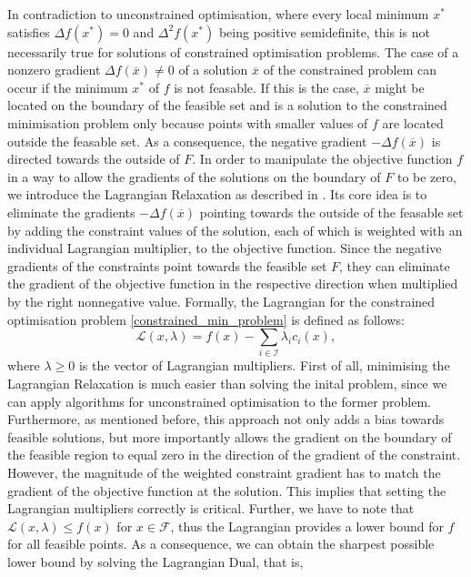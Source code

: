 \indent In contradiction to unconstrained optimisation, where every local minimum $x^*$ satisfies $\Delta f(x^*) = 0$ and $\Delta^2 f(x^*)$ being positive semidefinite, this is not necessarily true for solutions of constrained optimisation problems. The case of a nonzero gradient $\Delta f(\overline{x}) \neq 0$ of a solution $\overline{x}$ of the constrained problem can occur if the minimum $x^*$ of $f$ is not feasable. If this is the case, $\overline{x}$ might be located on the boundary of the feasible set and is a solution to the constrained minimisation problem only because points with smaller values of $f$ are located outside the feasable set. As a consequence, the negative gradient $-\Delta f(\overline{x})$ is directed towards the outside of $F$. In order to manipulate the objective function $f$ in a way to allow the gradients of the solutions on the boundary of $F$ to be zero, we introduce the Lagrangian Relaxation as described in \cite{NoceWrig06}. Its core idea is to eliminate the gradients $-\Delta f(\overline{x})$ pointing towards the outside of the feasable set by adding the constraint values of the solution, each of which is weighted with an individual Lagrangian multiplier, to the objective function. Since the negative gradients of the constraints point towards the feasible set $F$, they can eliminate the gradient of the objective function in the respective direction when multiplied by the right nonnegative value. Formally, the Lagrangian for the constrained optimisation problem \eqref{constrained_min_problem} is defined as follows:
\[ \mathcal{L}(x, \lambda) = f(x) - \sum_{i \in \mathcal{I}} \lambda_i c_i(x), \]
where $\lambda \geq 0$ is the vector of Lagrangian multipliers. First of all, minimising the Lagrangian Relaxation is much easier than solving the inital problem, since we can apply algorithms for unconstrained optimisation to the former problem. Furthermore, as mentioned before, this approach not only adds a bias towards feasible solutions, but more importantly allows the gradient on the boundary of the feasible region to equal zero in the direction of the gradient of the constraint. However, the magnitude of the weighted constraint gradient has to match the gradient of the objective function at the solution. This implies that setting the Lagrangian multipliers correctly is critical. Further, we have to note that $\mathcal{L}(x, \lambda) \leq f(x)$ for $x \in \mathcal{F}$, thus the Lagrangian provides a lower bound for $f$ for all feasible points. As a consequence, we can obtain the sharpest possible lower bound by solving the Lagrangian Dual, that is, 
